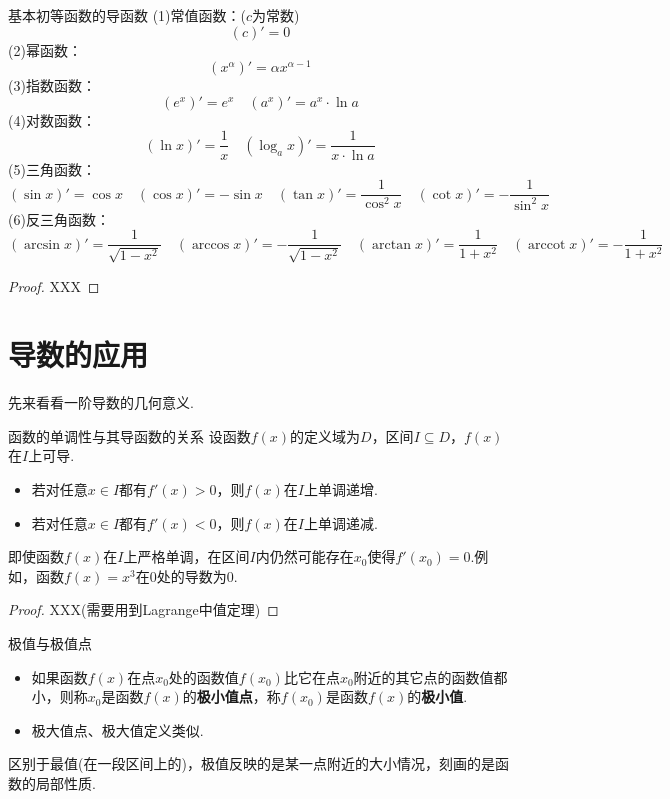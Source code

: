 \documentclass[lang=cn, zihao=5]{elegantbook}
\DeclareMathOperator{\arccot}{arccot}
\begin{document}
\begin{proposition}{基本初等函数的导函数}
	(1)常值函数：($c$为常数)$$(c)'=0$$
	(2)幂函数：$$(x^{\alpha})'=\alpha x^{\alpha -1}$$
	(3)指数函数：$$(e^x)'=e^x \quad (a^x)'=a^x \cdot \ln a$$
	(4)对数函数：$$(\ln x)'=\frac{1}{x} \quad (\log_{a}{x})'=\frac{1}{x\cdot \ln a}$$
	(5)三角函数：$$(\sin x)'=\cos x \quad (\cos x)'=-\sin x \quad (\tan x)'=\frac{1}{\cos ^2 x} \quad (\cot x)'=-\frac{1}{\sin ^2 x}$$
	(6)反三角函数：$$(\arcsin x)'=\frac{1}{\sqrt{1-x^2}} \quad (\arccos x)'=-\frac{1}{\sqrt{1-x^2}} \quad (\arctan x)'=\frac{1}{1+x^2} \quad (\arccot x)'=-\frac{1}{1+x^2}$$
\end{proposition}
\begin{proof}
	XXX
\end{proof}

\section{导数的应用}

先来看看一阶导数的几何意义.

\begin{theorem}{函数的单调性与其导函数的关系}
	设函数$f(x)$的定义域为$D$，区间$I \subseteq D$，$f(x)$在$I$上可导.
	\begin{itemize}
		\item 若对任意$x \in I$都有$f'(x)>0$，则$f(x)$在$I$上单调递增.
		\item 若对任意$x \in I$都有$f'(x)<0$，则$f(x)$在$I$上单调递减.
	\end{itemize}
\end{theorem}
\begin{remark}
	即使函数$f(x)$在$I$上严格单调，在区间$I$内仍然可能存在$x_0$使得$f'(x_0)=0$.例如，函数$f(x)=x^3$在$0$处的导数为$0$.
\end{remark}
\begin{proof}
	XXX(需要用到Lagrange中值定理)
\end{proof}

\begin{definition}{极值与极值点}
	\begin{itemize}
		\item 如果函数$f(x)$在点$x_0$处的函数值$f(x_0)$比它在点$x_0$附近的其它点的函数值都小，则称$x_0$是函数$f(x)$的\textbf{极小值点}，称$f(x_0)$是函数$f(x)$的\textbf{极小值}.
		\item 极大值点、极大值定义类似.
	\end{itemize}
\end{definition}
\begin{remark}
	区别于最值(在一段区间上的)，极值反映的是某一点附近的大小情况，刻画的是函数的局部性质.
\end{remark}
\end{document}

